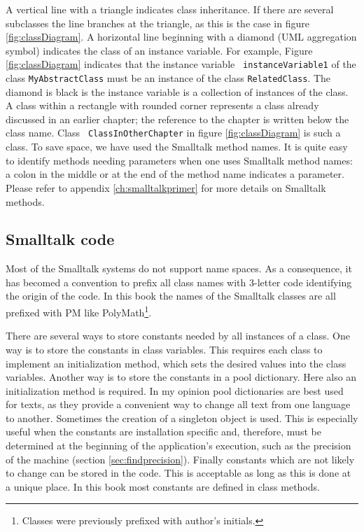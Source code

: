 \documentclass[twoside]{book}
\begin{document}
A vertical line with a triangle indicates class inheritance. If
there are several subclasses the line branches at the triangle, as
this is the case in figure \ref{fig:classDiagram}. A horizontal
line beginning with a diamond (UML aggregation symbol) indicates
the class of an instance variable. For example, Figure
\ref{fig:classDiagram} indicates that the instance variable {\tt
instanceVariable1} of the class {\tt MyAbstractClass} must be an
instance of the class {\tt RelatedClass}. The diamond is black is
the instance variable is a collection of instances of the class. A
class within a rectangle with rounded corner represents a class
already discussed in an earlier chapter; the reference to the
chapter is written below the class name. Class {\tt
ClassInOtherChapter} in figure \ref{fig:classDiagram} is such a
class. To save space, we have used the
Smalltalk method names. It is quite easy to identify methods
needing parameters when one uses Smalltalk method names: a
colon in the middle or at the end of the method name indicates
a parameter. Please refer to appendix \ref{ch:smalltalkprimer} for
more details on Smalltalk methods.

\subsection{Smalltalk code}
Most of the Smalltalk systems do not support name spaces. As a
consequence, it has becomed a convention to prefix all class names
with 3-letter code identifying the origin of the code. In this
book the names of the Smalltalk classes are all prefixed with PM like PolyMath\footnote{Classes were previously prefixed with author's initials.}.

There are several ways to store constants needed by all instances
of a class. One way is to store the constants in class variables.
This requires each class to implement an initialization method,
which sets the desired values into the class variables. Another
way is to store the constants in a pool dictionary. Here also an
initialization method is required. In my opinion pool dictionaries
are best used for texts, as they provide a convenient way to
change all text from one language to another. Sometimes the
creation of a singleton object is used. This is especially useful
when the constants are installation specific and, therefore, must
be determined at the beginning of the application's execution,
such as the precision of the machine (\cf section
\ref{sec:findprecision}). Finally constants which are not likely
to change can be stored in the code. This is acceptable as long as
this is done at a unique place. In this book most constants are
defined in class methods.
\end{document}
